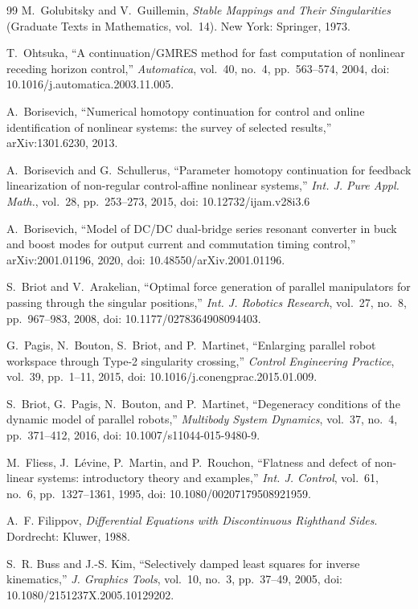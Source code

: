 \documentclass[11pt,american]{article}
\theoremstyle{definition}
\theoremstyle{plain}
\theoremstyle{remark}
\begin{document}
\begin{thebibliography}{99}
 M.~Golubitsky and V.~Guillemin, \emph{Stable Mappings and Their Singularities} (Graduate Texts in Mathematics, vol.~14). New York: Springer, 1973.

 T.~Ohtsuka, ``A continuation/GMRES method for fast computation of nonlinear receding horizon control,'' \emph{Automatica}, vol.~40, no.~4, pp.~563--574, 2004, doi: 10.1016/j.automatica.2003.11.005.

 A.~Borisevich, ``Numerical homotopy continuation for control and online identification of nonlinear systems: the survey of selected results,'' arXiv:1301.6230, 2013.

 A.~Borisevich and G.~Schullerus, ``Parameter homotopy continuation for feedback linearization of non-regular control-affine nonlinear systems,'' \emph{Int. J. Pure Appl. Math.}, vol.~28, pp.~253--273, 2015, doi: 10.12732/ijam.v28i3.6

 A.~Borisevich, ``Model of DC/DC dual-bridge series resonant converter in buck and boost modes for output current and commutation timing control,'' arXiv:2001.01196, 2020, doi: 10.48550/arXiv.2001.01196.

 S.~Briot and V.~Arakelian, ``Optimal force generation of parallel manipulators for passing through the singular positions,'' \emph{Int. J. Robotics Research}, vol.~27, no.~8, pp.~967--983, 2008, doi: 10.1177/0278364908094403.

 G.~Pagis, N.~Bouton, S.~Briot, and P.~Martinet, ``Enlarging parallel robot workspace through Type-2 singularity crossing,'' \emph{Control Engineering Practice}, vol.~39, pp.~1--11, 2015, doi: 10.1016/j.conengprac.2015.01.009.

 S.~Briot, G.~Pagis, N.~Bouton, and P.~Martinet, ``Degeneracy conditions of the dynamic model of parallel robots,'' \emph{Multibody System Dynamics}, vol.~37, no.~4, pp.~371--412, 2016, doi: 10.1007/s11044-015-9480-9.

 M.~Fliess, J.~L\'evine, P.~Martin, and P.~Rouchon, ``Flatness and defect of non-linear systems: introductory theory and examples,'' \emph{Int. J. Control}, vol.~61, no.~6, pp.~1327--1361, 1995, doi: 10.1080/00207179508921959.

 A.~F. Filippov, \emph{Differential Equations with Discontinuous Righthand Sides}. Dordrecht: Kluwer, 1988.

 S.~R. Buss and J.-S. Kim, ``Selectively damped least squares for inverse kinematics,'' \emph{J. Graphics Tools}, vol.~10, no.~3, pp.~37--49, 2005, doi: 10.1080/2151237X.2005.10129202.


\end{thebibliography}
\end{document}
